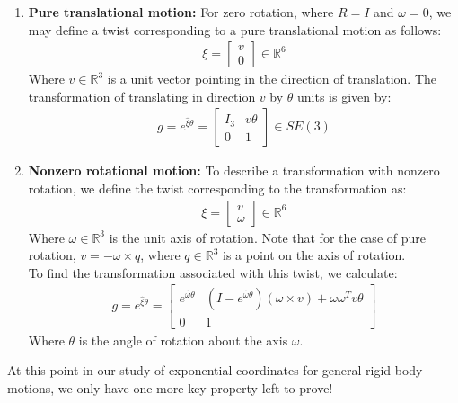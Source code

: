 \documentclass[oneside]{book}
\begin{document}
\begin{enumerate}
    \item \textbf{Pure translational motion:} For zero rotation, where $R = I$ and $\omega = 0$, we may define a twist corresponding to a pure translational motion as follows:
    \begin{align}
    \xi = 
        \begin{bmatrix}
            v\\
            0
        \end{bmatrix} \in \mathbb{R}^6
    \end{align}
    Where $v \in \mathbb{R}^3$ is a unit vector pointing in the direction of translation. The transformation of translating in direction $v$ by $\theta$ units is given by:
    \begin{align}
        g = e^{\hat\xi\theta} = 
        \begin{bmatrix}
            I_3 & v\theta\\
            0 & 1 
        \end{bmatrix}
        \in SE(3)
    \end{align}
    
    \item \textbf{Nonzero rotational motion:} To describe a transformation with nonzero rotation, we define the twist corresponding to the transformation as:
    \begin{align}
        \xi = 
        \begin{bmatrix}
            v\\
            \omega
        \end{bmatrix} \in \mathbb{R}^6
    \end{align}
    Where $\omega \in \mathbb{R}^3$ is the unit axis of rotation. Note that for the case of pure rotation, $v = -\omega \times q$, where $q\in \mathbb{R}^3$ is a point on the axis of rotation.\\
    To find the transformation associated with this twist, we calculate:
    \begin{align}
        g = e^{\hat\xi\theta} = \begin{bmatrix}
    e^{\hat\omega\theta} & (I - e^{\hat\omega\theta})( \omega\times v) + \omega\omega^Tv\theta\\
    0 & 1
    \end{bmatrix}
    \end{align}
    Where $\theta$ is the angle of rotation about the axis $\omega$.
\end{enumerate}
At this point in our study of exponential coordinates for general rigid body motions, we only have one more key property left to prove!\\
\end{document}
